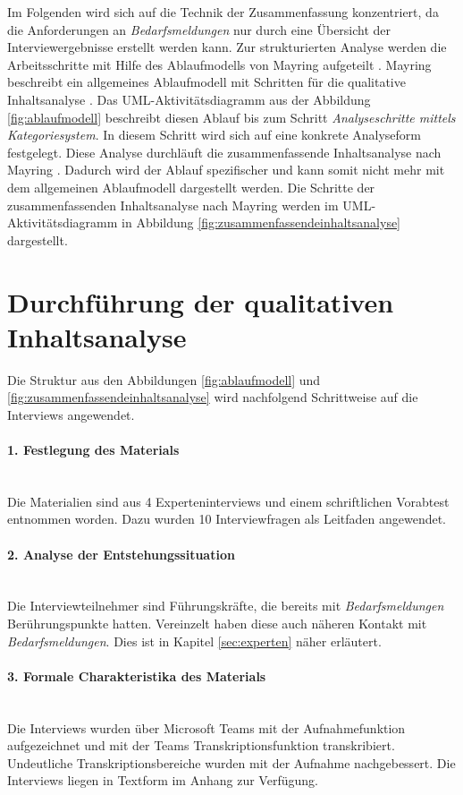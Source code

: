 Im Folgenden wird sich auf die Technik der Zusammenfassung konzentriert, da die Anforderungen an \emph{Bedarfsmeldungen} nur durch eine Übersicht der Interviewergebnisse erstellt werden kann. Zur strukturierten Analyse werden die Arbeitsschritte mit Hilfe des Ablaufmodells von Mayring aufgeteilt \cite{mayring2019qualitative}.
Mayring beschreibt ein allgemeines Ablaufmodell mit Schritten für die qualitative Inhaltsanalyse \cite{mayring2019qualitative}. Das UML-Aktivitätsdiagramm aus der Abbildung \ref{fig:ablaufmodell} beschreibt diesen Ablauf bis zum Schritt \emph{Analyseschritte mittels Kategoriesystem}. In diesem Schritt wird sich auf eine konkrete Analyseform festgelegt. Diese Analyse durchläuft die zusammenfassende Inhaltsanalyse nach Mayring \cite{mayring2019qualitative}. Dadurch wird der Ablauf spezifischer und kann somit nicht mehr mit dem allgemeinen Ablaufmodell dargestellt werden. Die Schritte der zusammenfassenden Inhaltsanalyse nach Mayring werden im UML-Aktivitätsdiagramm in Abbildung \ref{fig:zusammenfassendeinhaltsanalyse} dargestellt.
\section{Durchführung der qualitativen Inhaltsanalyse}
Die Struktur aus den Abbildungen \ref{fig:ablaufmodell} und \ref{fig:zusammenfassendeinhaltsanalyse} wird nachfolgend Schrittweise auf die Interviews angewendet.
\paragraph{1. Festlegung des Materials}\mbox{} \\
Die Materialien sind aus 4 Experteninterviews und einem schriftlichen Vorabtest entnommen worden. Dazu wurden 10 Interviewfragen als Leitfaden angewendet.
\paragraph{2. Analyse der Entstehungssituation}\mbox{} \\
Die Interviewteilnehmer sind Führungskräfte, die bereits mit \emph{Bedarfsmeldungen} Berührungspunkte hatten. Vereinzelt haben diese auch näheren Kontakt mit \emph{Bedarfsmeldungen}. Dies ist in Kapitel \ref{sec:experten} näher erläutert.
\paragraph{3. Formale Charakteristika des Materials}\mbox{} \\
Die Interviews wurden über Microsoft Teams mit der Aufnahmefunktion aufgezeichnet und mit der Teams Transkriptionsfunktion transkribiert. Undeutliche Transkriptionsbereiche wurden mit der Aufnahme nachgebessert. Die Interviews liegen in Textform im Anhang zur Verfügung.

